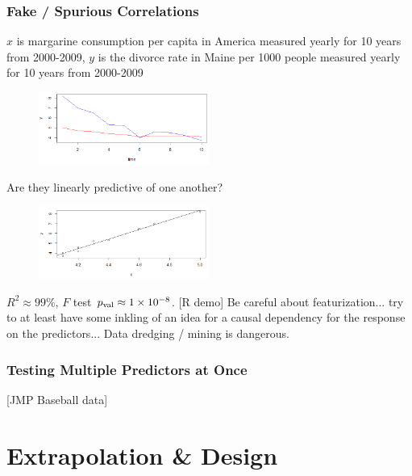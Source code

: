 \documentclass[handout]{beamer}
\begin{document}
\begin{frame}\frametitle{Fake / Spurious Correlations}

\footnotesize
$x$ is margarine consumption per capita in America measured yearly for 10 years from 2000-2009, $y$ is the divorce rate in Maine per 1000 people measured yearly for 10 years from 2000-2009

\vspace{-0.2cm}
\begin{figure}
\centering
\includegraphics[width=2.2in]{margarine_divorce_time.png}
\end{figure}

\vspace{-0.3cm}
Are they linearly predictive of one another? \pause

\vspace{-0.2cm}
\begin{figure}
\centering
\includegraphics[width=2.2in]{margarine_divorce.png}
\end{figure}
\pause


\vspace{-0.3cm}
$R^2 \approx 99\%$, $F$ test $p_{\text{val}} \approx 1 \times 10^{-8}$. [R demo] \pause Be careful about featurization... try to at least have some inkling of an idea for a causal dependency for the response on the predictors... Data dredging / mining is dangerous.

	
\end{frame}

\begin{frame}\frametitle{Testing Multiple Predictors at Once}

[JMP Baseball data]


	
\end{frame}

\section{Extrapolation \& Design}
\end{document}
